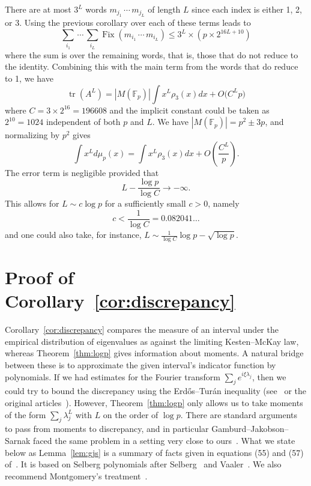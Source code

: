 \documentclass[10pt]{amsart}
\theoremstyle{definition}\newtheorem{defi}[theo]{Definition}\newtheorem{rema}[theo]{Remark}\newtheorem{exam}[theo]{Example}\newtheorem{exem}[theo]{Example}\newtheorem{nota}[theo]{Notation}
\newcommand{\F}{\mathbb{F}}
\DeclareMathOperator{\tr}{tr}
\DeclareMathOperator{\Fix}{Fix}
\begin{document}
There are at most $3^L$ words $m_{j_1}\,\cdots\, m_{j_L}$ of length $L$ since each index is either 1, 2, or 3. Using the previous corollary over each of these terms leads to
\[
\sum_{i_1}\,\cdots\,\sum_{i_L} \Fix(m_{i_1}\,\cdots\, m_{i_L}) \leq 3^L \times \left(p \times 2^{16L+10}\right)
\]
where the sum is over the remaining words, that is, those that do not reduce to the identity. Combining this with the main term from the words that do reduce to 1, we have
\[
\tr \left(A^L\right) = |M(\F_p)| \int x^L \rho_3(x) dx + O\big(C^L p \big)
\]
where $C=3 \times 2^{16} = 196608$ and the implicit constant could be taken as $2^{10}=1024$ independent of both $p$ and $L$. We have $|M(\F_p)| = p^2 \pm 3p$, and normalizing by $p^2$ gives
\[
\int x^L d\mu_p(x) = \int x^L \rho_3(x) dx + O\left(\frac{C^L }{p} \right).
\]
The error term is negligible provided that
\[
L - \frac{\log{p}}{\log{C} } \rightarrow - \infty.
\]
This allows for $L \sim c\log{p}$ for a sufficiently small $c > 0$, namely
\[
c < \frac{1}{\log{C} } = 0.082041\ldots
\]
and one could also take, for instance, $L \sim \frac{1}{\log{C}} \log{p} - \sqrt{\log{p}}$.

\section{Proof of Corollary~\ref{cor:discrepancy}} \label{sec:discrepancy}

Corollary~\ref{cor:discrepancy} compares the measure of an interval under the empirical distribution of eigenvalues as against the limiting Kesten--McKay law, whereas Theorem~\ref{thm:logp} gives information about moments. A natural bridge between these is to approximate the given interval's indicator function by polynomials. If we had estimates for the Fourier transform $\sum_j e^{i \xi \lambda_j}$, then we could try to bound the discrepancy using the Erd\H{o}s\linebreak--Turán inequality (see~\cite[Corollary~1.1]{Mon} or the original articles~\cite{ET1, ET2}). However, Theorem~\ref{thm:logp} only allows us to take moments of the form $\sum_j \lambda_j^L$ with $L$ on the order of $\log{p}$. There are standard arguments to pass from moments to discrepancy, and in particular Gamburd--Jakobson--Sarnak faced the same problem in a setting very close to ours~\cite{GJS}. What we state below as Lemma~\ref{lem:gjs} is a summary of facts given in equations (55) and (57) of~\cite[Proof of Theorem~1.3]{GJS}. It is based on Selberg polynomials after Selberg~\cite[p.~213--219]{S} and Vaaler~\cite{V}. We also recommend Montgomery's treatment~\cite[p.~5--15]{Mon}.
\end{document}
